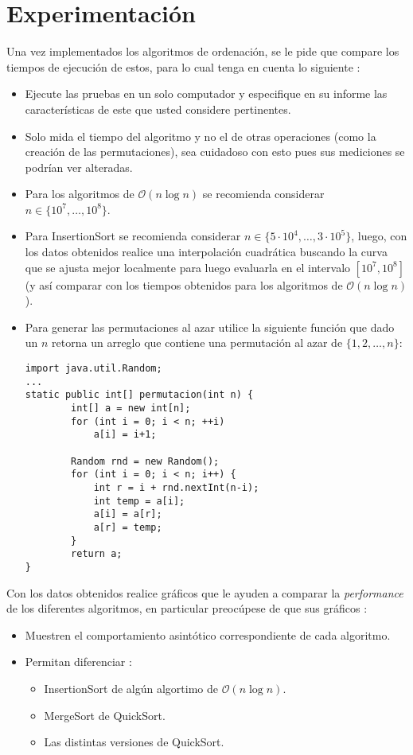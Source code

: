 \documentclass[dcc]{fcfmcourse}
\begin{document}
\section{Experimentación}
Una vez implementados los algoritmos de ordenación, se le pide que compare los tiempos de ejecución de estos, para lo cual tenga en cuenta lo siguiente :
\begin{itemize}
\item Ejecute las pruebas en un solo computador y especifique en su informe las características de este que usted considere pertinentes.
\item Solo mida el tiempo del algoritmo y no el de otras operaciones (como la creación de las permutaciones), sea cuidadoso con esto pues sus mediciones se podrían ver alteradas.
\item Para los algoritmos de $\mathcal{O} (n \log n)$  se recomienda considerar $n \in \lbrace 10^7 , \ldots, 10^8\rbrace$.
\item Para InsertionSort se recomienda considerar $n \in \lbrace 5 \cdot 10^4 , \ldots, 3 \cdot 10^5\rbrace$, luego, con los datos obtenidos realice una interpolación cuadrática buscando la curva que se ajusta mejor localmente para luego evaluarla en el intervalo $[10^7, 10^8]$ (y así comparar con los tiempos obtenidos para los algoritmos de $\mathcal{O} (n \log n)$).
\item Para generar las permutaciones al azar utilice la siguiente función que dado un $n$ retorna un arreglo que contiene una permutación al azar de $\lbrace 1, 2 , \ldots, n\rbrace$:
\begin{lstlisting}
import java.util.Random;
...
static public int[] permutacion(int n) {
	 	int[] a = new int[n];
	 	for (int i = 0; i < n; ++i)
	 		a[i] = i+1;
	 	
	 	Random rnd = new Random();
	    for (int i = 0; i < n; i++) {
	        int r = i + rnd.nextInt(n-i);
	        int temp = a[i];
	        a[i] = a[r];
	        a[r] = temp;
	    }
	    return a;
}
\end{lstlisting}

\end{itemize}
Con los datos obtenidos realice gráficos que le ayuden a comparar la \textit{performance} de los diferentes algoritmos, en particular preocúpese de que sus gráficos :
\begin{itemize}
\item Muestren el comportamiento asintótico correspondiente de cada algoritmo.
\item Permitan diferenciar :
\begin{itemize}
\item InsertionSort de algún algortimo de $\mathcal{O} (n \log n)$.
\item MergeSort de QuickSort.
\item Las distintas versiones de QuickSort.
\end{itemize}
\end{itemize} 
\newpage
\end{document}
